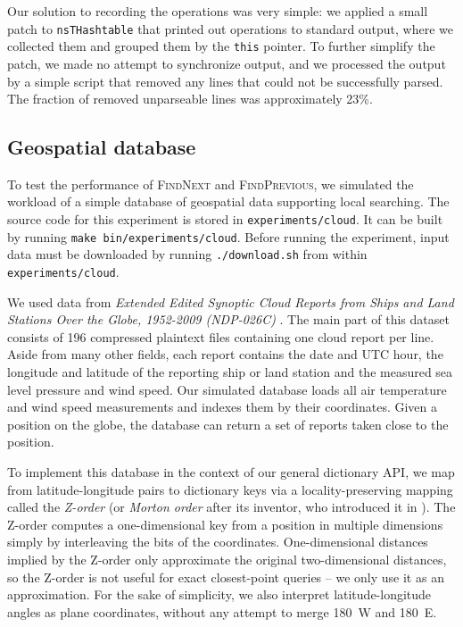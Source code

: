 Our solution to recording the operations was very simple: we applied a small
patch to \texttt{nsTHashtable} that printed out operations to standard output,
where we collected them and grouped them by the \texttt{this} pointer.
To further simplify the patch, we made no attempt to synchronize output,
and we processed the output by a simple script that removed any lines that
could not be successfully parsed. The fraction of removed unparseable lines
was approximately 23\%.

\subsection{Geospatial database}
To test the performance of \textsc{FindNext} and \textsc{FindPrevious}, we
simulated the workload of a simple database of geospatial data supporting
local searching. The source code for this experiment is stored in
\texttt{experiments/cloud}. It can be built by running \texttt{make
bin/experiments/cloud}. Before running the experiment, input data must
be downloaded by running \texttt{./download.sh} from within
\texttt{experiments/cloud}.

We used data from \emph{Extended Edited Synoptic Cloud Reports from Ships and
Land Stations Over the Globe, 1952-2009 (NDP-026C)} \cite{cloud-reports}.
The main part of this dataset consists of 196 compressed plaintext files
containing one cloud report per line. Aside from many other fields,
each report contains the date and UTC hour, the longitude and latitude of the
reporting ship or land station and the measured sea level pressure and
wind speed.
Our simulated database loads all air temperature and wind speed measurements
and indexes them by their coordinates. Given a position on the globe, the
database can return a set of reports taken close to the position.

To implement this database in the context of our general dictionary API,
we map from latitude-longitude pairs to dictionary keys via a
locality-preserving mapping called the \emph{Z-order} (or
\emph{Morton order} after its inventor, who introduced it in
\cite{morton-order}). The Z-order computes a one-dimensional key from
a position in multiple dimensions simply by interleaving the bits of
the coordinates. One-dimensional distances implied by the Z-order only
approximate the original two-dimensional distances, so the Z-order is
not useful for exact closest-point queries -- we only use it as an
approximation. For the sake of simplicity, we also interpret
latitude-longitude angles as plane coordinates, without any attempt
to merge 180\textdegree~W and 180\textdegree~E.

